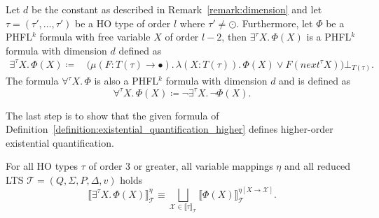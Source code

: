 \begin{definition}
    \label{definition:existential_quantification_higher}
    Let $d$ be the constant as described in Remark~\ref{remark:dimension} and let $\tau = (\tau', \dots, \tau')$ be a HO type of order $l$ where $\tau' \neq \odot$. Furthermore, let
    $\Phi$ be a PHFL$^k$ formula with free variable $X$ of order $l - 2$, then $\exists^{\tau}X .\,\Phi(X)$
    is a PHFL$^k$ formula with dimension $d$ defined as
    \begin{align*}
        \exists^{\tau}X.\, \Phi(X) \coloneqq &\,\big(\mu (F \colon T(\tau) \rightarrow \bullet).\, \lambda (X \colon T(\tau)
        ).\,
        \Phi(X)
        \vee F(next^\tau X)\big)\bot_{T(\tau)}.
    \end{align*}
    The formula $\forall^{\tau}X.\,\Phi$ is also a PHFL$^k$ formula with dimension $d$ and is defined as
    \[\forall^{\tau}X.\,\Phi(X) \coloneqq \neg \exists^{\tau}X .\,\neg\Phi(X).\]
\end{definition}

The last step is to show that the given formula of Definition~\ref{definition:existential_quantification_higher} defines
higher-order existential quantification.

\begin{lemma}
    \label{lemma:existential_quantifier_higher}
    For all HO types $\tau$ of order $3$ or greater, all variable mappings $\eta$ and all reduced LTS $\mathcal{T} = (Q, \Sigma, P, \Delta, v)$ holds
    \[\llbracket \exists^\tau X.\,\Phi(X)\rrbracket^\eta_\mathcal{T} \equiv \underset{\mathcal{X} \in \llbracket \tau
    \rrbracket_\mathcal{T}}{\bigsqcup} \llbracket \Phi(X) \rrbracket^{\eta[X\rightarrow \mathcal{X}]}_\mathcal{T}.\]
\end{lemma}

